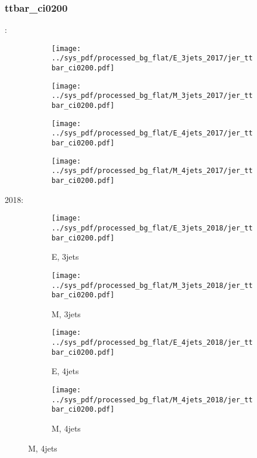 \documentclass{beamer}
\begin{document}
\begin{frame}
\frametitle{ttbar_ci0200}
\fontsize{5}{1}:
\begin{figure}
\centering
\begin{subfigure}[b]{0.24\textwidth}
\texttt{[image: ../sys\_pdf/processed\_bg\_flat/E\_3jets\_2017/jer\_ttbar\_ci0200.pdf]}
\end{subfigure}
\begin{subfigure}[b]{0.24\textwidth}
\texttt{[image: ../sys\_pdf/processed\_bg\_flat/M\_3jets\_2017/jer\_ttbar\_ci0200.pdf]}
\end{subfigure}
\begin{subfigure}[b]{0.24\textwidth}
\texttt{[image: ../sys\_pdf/processed\_bg\_flat/E\_4jets\_2017/jer\_ttbar\_ci0200.pdf]}
\end{subfigure}
\begin{subfigure}[b]{0.24\textwidth}
\texttt{[image: ../sys\_pdf/processed\_bg\_flat/M\_4jets\_2017/jer\_ttbar\_ci0200.pdf]}
\end{subfigure}
\end{figure}
2018:
\begin{figure}
\centering
\begin{subfigure}[b]{0.24\textwidth}
\texttt{[image: ../sys\_pdf/processed\_bg\_flat/E\_3jets\_2018/jer\_ttbar\_ci0200.pdf]}
\captionsetup{font=tiny}
\caption{E, 3jets}
\end{subfigure}
\begin{subfigure}[b]{0.24\textwidth}
\texttt{[image: ../sys\_pdf/processed\_bg\_flat/M\_3jets\_2018/jer\_ttbar\_ci0200.pdf]}
\captionsetup{font=tiny}
\caption{M, 3jets}
\end{subfigure}
\begin{subfigure}[b]{0.24\textwidth}
\texttt{[image: ../sys\_pdf/processed\_bg\_flat/E\_4jets\_2018/jer\_ttbar\_ci0200.pdf]}
\captionsetup{font=tiny}
\caption{E, 4jets}
\end{subfigure}
\begin{subfigure}[b]{0.24\textwidth}
\texttt{[image: ../sys\_pdf/processed\_bg\_flat/M\_4jets\_2018/jer\_ttbar\_ci0200.pdf]}
\captionsetup{font=tiny}
\caption{M, 4jets}
\end{subfigure}
\end{figure}
\end{frame}
\end{document}
